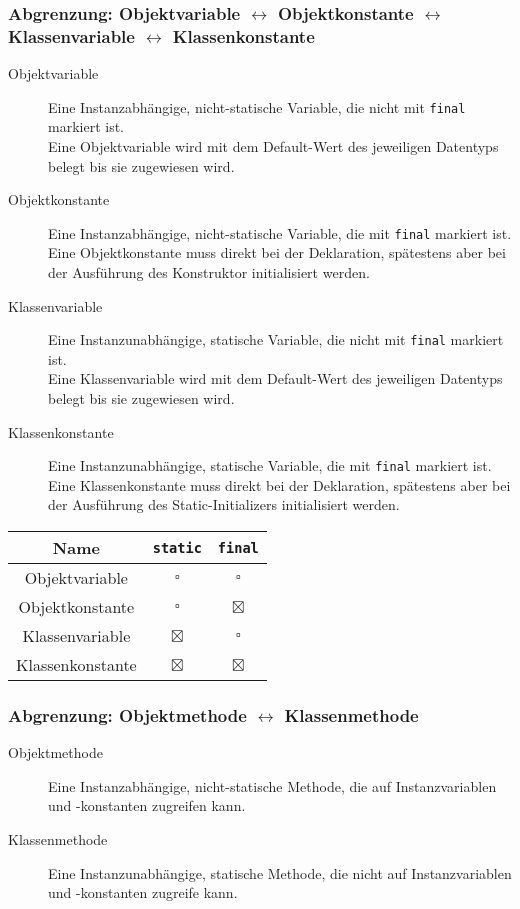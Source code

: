 	\subsubsection{Abgrenzung: Objektvariable \(\leftrightarrow\) Objektkonstante \(\leftrightarrow\) Klassenvariable \(\leftrightarrow\) Klassenkonstante}
		\begin{description}
			\item[Objektvariable] Eine Instanzabhängige, nicht-statische Variable, die nicht mit \lstinline|final| markiert ist. \\ Eine Objektvariable wird mit dem Default-Wert des jeweiligen Datentyps belegt bis sie zugewiesen wird.
			\item[Objektkonstante] Eine Instanzabhängige, nicht-statische Variable, die mit \lstinline|final| markiert ist. \\ Eine Objektkonstante muss direkt bei der Deklaration, spätestens aber bei der Ausführung des Konstruktor initialisiert werden.
			\item[Klassenvariable] Eine Instanzunabhängige, statische Variable, die nicht mit \lstinline|final| markiert ist. \\ Eine Klassenvariable wird mit dem Default-Wert des jeweiligen Datentyps belegt bis sie zugewiesen wird.
			\item[Klassenkonstante] Eine Instanzunabhängige, statische Variable, die mit \lstinline|final| markiert ist. \\ Eine Klassenkonstante muss direkt bei der Deklaration, spätestens aber bei der Ausführung des Static-Initializers initialisiert werden.
		\end{description}

		\begin{table}[H]
			\centering
			\begin{tabular}{c | c | c}
				 \textbf{Name}   & \lstinline|static| & \lstinline|final| \\ \hline
				 Objektvariable  & \(\square\)        & \(\square\)       \\
				Objektkonstante  & \(\square\)        & \(\boxtimes\)     \\
				Klassenvariable  & \(\boxtimes\)      & \(\square\)       \\
				Klassenkonstante & \(\boxtimes\)      & \(\boxtimes\)
			\end{tabular}
		\end{table}
	
	\subsubsection{Abgrenzung: Objektmethode \(\leftrightarrow\) Klassenmethode}
		\begin{description}
			\item[Objektmethode] Eine Instanzabhängige, nicht-statische Methode, die auf Instanzvariablen und -konstanten zugreifen kann.
			\item[Klassenmethode] Eine Instanzunabhängige, statische Methode, die nicht auf Instanzvariablen und -konstanten zugreife kann.
		\end{description}
	
